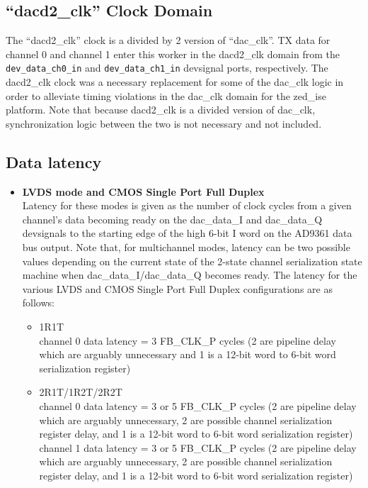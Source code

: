 \documentclass{article}
\begin{document}
\subsection*{``dacd2\_clk'' Clock Domain}
The ``dacd2\_clk'' clock is a divided by 2 version of ``dac\_clk''. TX data for channel 0 and channel 1 enter this worker in the dacd2\_clk domain from the  \verb+dev_data_ch0_in+ and \verb+dev_data_ch1_in+ devsignal ports, respectively. The dacd2\_clk clock was a necessary replacement for some of the dac\_clk logic in order to alleviate timing violations in the dac\_clk domain for the zed\_ise platform. Note that because dacd2\_clk is a divided version of dac\_clk, synchronization logic between the two is not necessary and not included.
\subsection*{Data latency}
\begin{itemize}
	\item{\textbf{LVDS mode and CMOS Single Port Full Duplex}} \\ Latency for these modes is given as the number of clock cycles from a given channel's data becoming ready on the dac\_data\_I and dac\_data\_Q devsignals to the starting edge of the high 6-bit I word on the AD9361 data bus output. Note that, for multichannel modes, latency can be two possible values depending on the current state of the 2-state channel serialization state machine when dac\_data\_I/dac\_data\_Q becomes ready. The latency for the various LVDS and CMOS Single Port Full Duplex configurations are as follows:
\begin{itemize}
	\item{1R1T} \\channel 0 data latency = 3 FB\_CLK\_P cycles (2 are pipeline delay which are arguably unnecessary and 1 is a 12-bit word to 6-bit word serialization register)
	\item{2R1T/1R2T/2R2T} \\channel 0 data latency = 3 or 5 FB\_CLK\_P cycles (2 are pipeline delay which are arguably unnecessary, 2 are possible channel serialization register delay, and 1 is a 12-bit word to 6-bit word serialization register) \\channel 1 data latency = 3 or 5 FB\_CLK\_P cycles (2 are pipeline delay which are arguably unnecessary, 2 are possible channel serialization register delay, and 1 is a 12-bit word to 6-bit word serialization register)
\end{itemize}
\end{itemize}
\pagebreak
\end{document}
